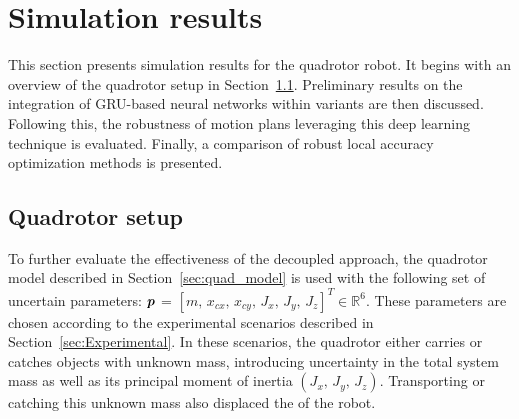 \section{Simulation results} \label{sec:SimuResults}

This section presents simulation results for the quadrotor robot. 
It begins with an overview of the quadrotor setup in Section~\ref{sec:quad_setup}. 
Preliminary results on the integration of GRU-based neural networks within  variants are then discussed. 
Following this, the robustness of motion plans leveraging this deep learning technique is evaluated. 
Finally, a comparison of robust local accuracy optimization methods is presented.

\subsection{Quadrotor setup} \label{sec:quad_setup}

To further evaluate the effectiveness of the decoupled approach, the quadrotor model described in Section~\ref{sec:quad_model} is used with the following set of uncertain parameters: $\boldsymbol{p}$ = $[m, \, x_{cx}, \, x_{cy}, \, J_{x}, \, J_{y}, \,J_{z}]^T \in \mathbb{R}^{6}$.
These parameters are chosen according to the experimental scenarios described in Section~\ref{sec:Experimental}.
In these scenarios, the quadrotor either carries or catches objects with unknown mass, introducing uncertainty in the total system mass as well as its principal moment of inertia $(J_{x}, \, J_{y}, \,J_{z})$.
Transporting or catching this unknown mass also displaced the  of the robot.

